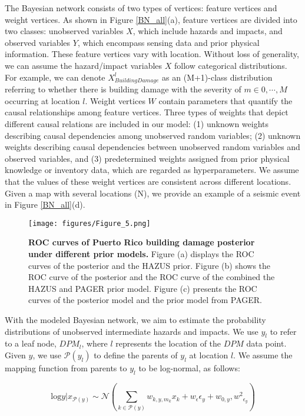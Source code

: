 \documentclass[review]{elsarticle}
\begin{document}
The Bayesian network consists of two types of vertices: feature vertices and weight vertices. As shown in Figure \ref{BN_all}(a), feature vertices are divided into two classes: unobserved variables $X$, which include hazards and impacts, and observed variables $Y$, which encompass sensing data and prior physical information. These feature vertices vary with location. Without loss of generality, we can assume the hazard/impact variables $X$ follow categorical distributions. For example, we can denote $X_{Building Damage}^{l}$ as an (M+1)-class distribution referring to whether there is building damage with the severity of $m \in {0, \cdots, M}$ occurring at location $l$. Weight vertices $W$ contain parameters that quantify the causal relationships among feature vertices. Three types of weights that depict different causal relations are included in our model: (1) unknown weights describing causal dependencies among unobserved random variables; (2) unknown weights describing causal dependencies between unobserved random variables and observed variables, and (3) predetermined weights assigned from prior physical knowledge or inventory data, which are regarded as hyperparameters. We assume that the values of these weight vertices are consistent across different locations. Given a map with several locations (N), we provide an example of a seismic event in Figure \ref{BN_all}(d).


\begin{figure*}[t]
    \centering
    \texttt{[image: figures/Figure\_5.png]}\caption{\textbf{ROC curves of Puerto Rico building damage posterior under different prior models.} Figure (a) displays the ROC curves of the posterior and the HAZUS prior. Figure (b) shows the ROC curve of the posterior and the ROC curve of the combined the HAZUS and PAGER prior model. Figure (c) presents the ROC curves of the posterior model and the prior model from PAGER. }
    \label{PR_bin_ROC}
\end{figure*}

With the modeled Bayesian network, we aim to estimate the probability distributions of unobserved intermediate hazards and impacts. We use $y_{l}$ to refer to a leaf node, $DPM_{l}$, where $l$ represents the location of the $DPM$ data point. Given $y$, we use $\mathcal{P}(y_{l})$ to define the parents of $y_{l}$ at location $l$. We assume the mapping function from parents to $y_{l}$ to be log-normal, as follows:

\begin{equation*}
    \text{log}y|x_{\mathcal{P}(y)} \sim \mathcal N(\sum_{k \in {\mathcal{P}(y)}}w_{ k,y,m_{k}}x_k + w_{\epsilon}\epsilon_{y} + w_{0,y}, {w^2}_{\epsilon_{y}})
\end{equation*}
\end{document}
